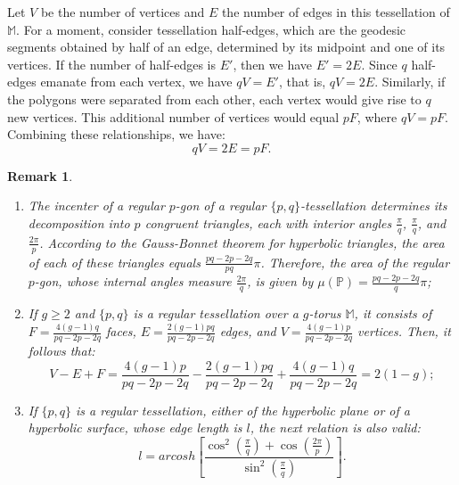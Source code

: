 \documentclass[%
reprint,
amsmath,amssymb,
aps,
]{revtex4-2}
\newcommand{\M}{\mathbb{M}}
\newtheorem{remark}[theorem]{{\bf Remark}}
\begin{document}
Let $V$ be the number of vertices and $E$ the number of edges in this tessellation of $\M$. For a moment, consider tessellation half-edges, which are the geodesic segments obtained by half of an edge, determined by its midpoint and one of its vertices. If the number of half-edges is $E'$, then we have $E'=2E$. Since $q$ half-edges emanate from each vertex, we have $qV=E'$, that is, $qV=2E$. Similarly, if the polygons were separated from each other, each vertex would give rise to $q$  new vertices. This additional number of vertices would equal $pF$, where $ qV = pF$. Combining these relationships, we have:
\begin{equation}\label{eq:relacao-faces-vertices-arestas-tesselacao}
	qV=2E=pF.
\end{equation} 

\begin{remark}
	
	\begin{enumerate}
		
		\item The incenter of a regular $ p $-gon of a regular $ \{p,q\} $-tessellation  determines its decomposition into $ p $ congruent triangles, each with interior angles $ \frac\pi q $, $ \frac\pi q $, and $ \frac{2\pi} p $. According to the Gauss-Bonnet theorem for hyperbolic triangles, the area of each of these triangles equals $ \frac{pq-2p-2q}{pq}\pi $. Therefore, the area of the regular $ p $-gon, whose internal angles measure $ \frac{2\pi}q $, is given by $\mu(\mathbb{P})=\frac{pq-2p-2q}{ q}\pi $;
		
		\item If $ g\geq 2 $ and $ \{p,q\} $ is a regular tessellation over a $ g $-torus $  \M  $, it consists of $ F=\frac{4(g-1)q}{pq-2p-2q} $ faces, $ E=\frac{2(g-1)pq}{pq-2p-2q} $ edges, and $ V=\frac{4(g-1)p}{pq -2p-2q}$ vertices. Then, it follows that:		
		\[
		V-E+F=\frac{4(g-1)p}{pq-2p-2q} -\frac{2(g-1)pq}{pq-2p-2q} +\frac{4(g-1)q}{pq-2p-2q} =2(1-g); 
		\]
		
		\item If $ \{p,q\} $ is a regular tessellation, either of the hyperbolic plane or of a hyperbolic surface, whose edge length is $ l $, the next relation is also valid:		
		\[
		l= arcosh \displaystyle\left[ \frac{\cos^2\displaystyle\left( \frac\pi q\right) +\cos\displaystyle\left(  \frac{2\pi}{p}\right)  }{\sin ^2\displaystyle\left(  \frac\pi q \right)} \right].
		\]
	\end{enumerate}	
\end{remark}
\end{document}
